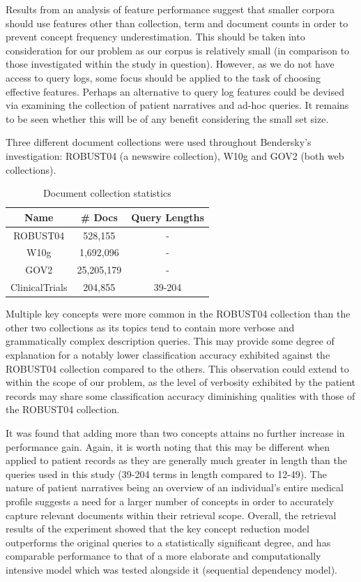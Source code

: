 \documentclass[a4paper]{report}
\begin{document}
Results from an analysis of feature performance suggest that smaller corpora should use features other than collection, term and document counts in order to prevent concept frequency underestimation. This should be taken into consideration for our problem as our corpus is relatively small (in comparison to those investigated within the study in question). However, as we do not have access to query logs, some focus should be applied to the task of choosing effective features. Perhaps an alternative to query log features could be devised via examining the collection of patient narratives and ad-hoc queries. It remains to be seen whether this will be of any benefit considering the small set size. 

Three different document collections were used throughout Bendersky's investigation: ROBUST04 (a newswire collection), W10g and GOV2 (both web collections). 

\begin{table}
\caption{Document collection statistics}
\begin{center}
  \begin{tabular}{ | c | c | c | }
  	\hline
    \textbf{Name} & \textbf{\# Docs} & \textbf{Query Lengths}\\
    \hline 
    ROBUST04 & 528,155 & - \\
    W10g & 1,692,096 & - \\
    GOV2 & 25,205,179 & - \\
    ClinicalTrials & 204,855 & 39-204 \\
    \hline
  \end{tabular}
\end{center}
\end{table}

Multiple key concepts were more common in the ROBUST04 collection than the other two collections as its topics tend to contain more verbose and grammatically complex description queries. This may provide some degree of explanation for a notably lower classification accuracy exhibited against the ROBUST04 collection compared to the others. This observation could extend to within the scope of our problem, as the level of verbosity exhibited by the patient records may share some classification accuracy diminishing qualities with those of the ROBUST04 collection. 

It was found that adding more than two concepts attains no further increase in performance gain. Again, it is worth noting that this may be different when applied to patient records as they are generally much greater in length than the queries used in this study (39-204 terms in length compared to 12-49). The nature of patient narratives being an overview of an individual's entire medical profile suggests a need for a larger number of concepts in order to accurately capture relevant documents within their retrieval scope. Overall, the retrieval results of the experiment showed that the key concept reduction model outperforms the original queries to a statistically significant degree, and has comparable performance to that of a more elaborate and computationally intensive model which was tested alongside it (sequential dependency model). 
  
\end{document}
